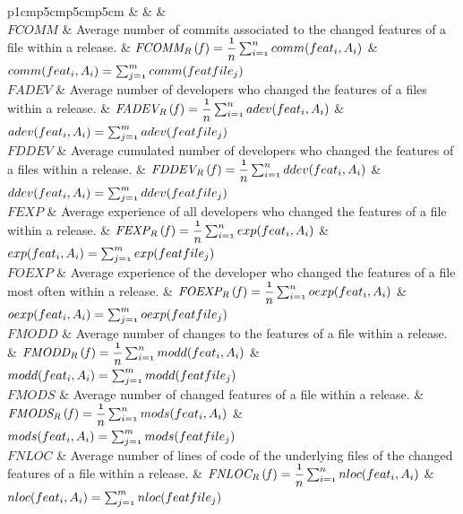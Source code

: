 \begin{table}[!t]
\begin{threeparttable}
\begin{tabulary}{\textwidth}{p{1cm}p{5cm}p{5cm}p{5cm}}
			\toprule
			&	&		&		\\
			\midrule
			$FCOMM$ & Average number of commits associated to the changed features of a file within a release. & $\mathit{FCOMM_R\,(f)} = \mathnormal{\dfrac{1}{n}\sum_{i=1}^{n} comm(feat_i,A_i)}$ & $\mathnormal{comm(feat_i,A_i) = \sum_{j=1}^{m} comm(featfile_j) }$ \\
			$FADEV$ & Average number of developers who changed the features of a files within a release. & $\mathit{FADEV_R\,(f)} = \mathnormal{\dfrac{1}{n}\sum_{i=1}^{n} adev(feat_i,A_i)}$ & $\mathnormal{adev(feat_i,A_i) = \sum_{j=1}^{m} adev(featfile_j) }$ \\
			$FDDEV$ & Average cumulated number of developers who changed the features of a files within a release. & $\mathit{FDDEV_R\,(f)} = \mathnormal{\dfrac{1}{n}\sum_{i=1}^{n} ddev(feat_i,A_i)}$ & $\mathnormal{ddev(feat_i,A_i) = \sum_{j=1}^{m} ddev(featfile_j) }$ \\
			$FEXP$ & Average experience of all developers who changed the features of a file within a release. & $\mathit{FEXP_R\,(f)} = \mathnormal{\dfrac{1}{n}\sum_{i=1}^{n} exp(feat_i,A_i)}$ & $\mathnormal{exp(feat_i,A_i) = \sum_{j=1}^{m} exp(featfile_j) }$ \\
			$FOEXP$ & Average experience of the developer who changed the features of a file most often within a release. & $\mathit{FOEXP_R\,(f)} = \mathnormal{\dfrac{1}{n}\sum_{i=1}^{n} oexp(feat_i,A_i)}$ & $\mathnormal{oexp(feat_i,A_i) = \sum_{j=1}^{m} oexp(featfile_j) }$ \\
			$FMODD$ & Average number of changes to the features of a file within a release. & $\mathit{FMODD_R\,(f)} = \mathnormal{\dfrac{1}{n}\sum_{i=1}^{n} modd(feat_i,A_i)}$ & $\mathnormal{modd(feat_i,A_i) = \sum_{j=1}^{m} modd(featfile_j) }$ \\
			$FMODS$ & Average number of changed features of a file within a release. & $\mathit{FMODS_R\,(f)} = \mathnormal{\dfrac{1}{n}\sum_{i=1}^{n} mods(feat_i,A_i)}$ & $\mathnormal{mods(feat_i,A_i) = \sum_{j=1}^{m} mods(featfile_j) }$ \\
			$FNLOC$ & Average number of lines of code of the underlying files of the changed features of a file within a release. & $\mathit{FNLOC_R\,(f)} = \mathnormal{\dfrac{1}{n}\sum_{i=1}^{n} nloc(feat_i,A_i)}$ & $\mathnormal{nloc(feat_i,A_i) = \sum_{j=1}^{m} nloc(featfile_j) }$ \\

\end{tabulary}
\end{threeparttable}
\end{table}
